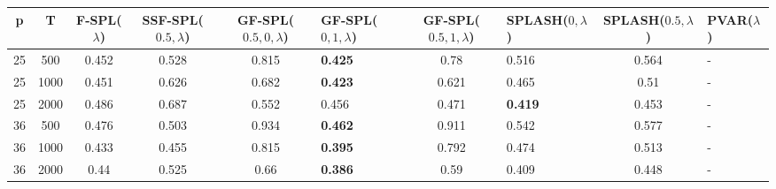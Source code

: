 \begin{tabular}{ccccclclcl}
\hline
  p  &  T   &  F-SPL($\lambda$)  &  SSF-SPL($0.5, \lambda$)  &  GF-SPL($0.5, 0, \lambda$)  & GF-SPL($0, 1, \lambda$)   &  GF-SPL($0.5, 1, \lambda$)  & SPLASH($0, \lambda$)   &  SPLASH($0.5, \lambda$)  & PVAR($\lambda$)   \\
\hline
 25  & 500  &       0.452        &           0.528           &            0.815            & \textbf{0.425}            &            0.78             & 0.516                  &          0.564           & -                 \\
 25  & 1000 &       0.451        &           0.626           &            0.682            & \textbf{0.423}            &            0.621            & 0.465                  &           0.51           & -                 \\
 25  & 2000 &       0.486        &           0.687           &            0.552            & 0.456                     &            0.471            & \textbf{0.419}         &          0.453           & -                 \\
 36  & 500  &       0.476        &           0.503           &            0.934            & \textbf{0.462}            &            0.911            & 0.542                  &          0.577           & -                 \\
 36  & 1000 &       0.433        &           0.455           &            0.815            & \textbf{0.395}            &            0.792            & 0.474                  &          0.513           & -                 \\
 36  & 2000 &        0.44        &           0.525           &            0.66             & \textbf{0.386}            &            0.59             & 0.409                  &          0.448           & -                 \\
\hline
\end{tabular}
